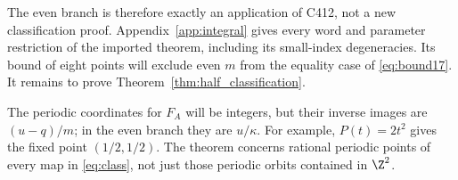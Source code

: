 The even branch is therefore exactly an application of C412, not a
new classification proof. Appendix~\ref{app:integral} gives every
word and parameter restriction of the imported theorem, including
its small-index degeneracies. Its bound of eight points will exclude
even $m$ from the equality case of \eqref{eq:bound17}.
It remains to prove Theorem~\ref{thm:half_classification}.

\begin{remark}
The periodic coordinates for $F_A$ will be integers, but their inverse
images are $(u-q)/m$; in the even branch they are $u/\kappa$.
For example, $P(t)=2t^2$ gives the fixed point $(1/2,1/2)$.
The theorem concerns rational periodic points of every map in
\eqref{eq:class}, not just those periodic orbits contained in $\Z^2$.
\end{remark}
